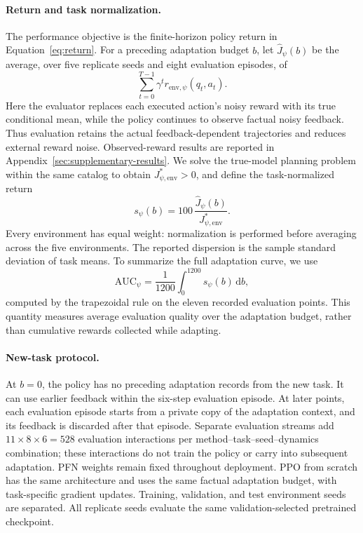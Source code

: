 \documentclass[a4paper,11pt]{article}
\numberwithin{equation}{section}
\begin{document}
\paragraph{Return and task normalization.}
The performance objective is the finite-horizon policy return in Equation~\eqref{eq:return}. For a preceding adaptation budget $b$, let $\widehat J_{\psi}(b)$ be the average, over five replicate seeds and eight evaluation episodes, of
\begin{equation}
\sum_{t=0}^{T-1}\gamma^t r_{\mathrm{env},\psi}(q_t,a_t).
\label{eq:empirical-mean-return}
\end{equation}
Here the evaluator replaces each executed action's noisy reward with its true conditional mean, while the policy continues to observe factual noisy feedback. Thus evaluation retains the actual feedback-dependent trajectories and reduces external reward noise. Observed-reward results are reported in Appendix~\ref{sec:supplementary-results}. We solve the true-model planning problem within the same catalog to obtain $J^*_{\psi,\mathrm{env}}>0$, and define the task-normalized return
\begin{equation}
s_{\psi}(b)=100\,\frac{\widehat J_{\psi}(b)}{J^*_{\psi,\mathrm{env}}}.
\label{eq:normalized-return}
\end{equation}
Every environment has equal weight: normalization is performed before averaging across the five environments. The reported dispersion is the sample standard deviation of task means. To summarize the full adaptation curve, we use
\begin{equation}
\mathrm{AUC}_{\psi}=\frac{1}{1200}\int_{0}^{1200}s_{\psi}(b)\,\mathrm db,
\label{eq:normalized-auc}
\end{equation}
computed by the trapezoidal rule on the eleven recorded evaluation points. This quantity measures average evaluation quality over the adaptation budget, rather than cumulative rewards collected while adapting.

\paragraph{New-task protocol.}
At $b=0$, the policy has no preceding adaptation records from the new task. It can use earlier feedback within the six-step evaluation episode. At later points, each evaluation episode starts from a private copy of the adaptation context, and its feedback is discarded after that episode. Separate evaluation streams add $11\times8\times6=528$ evaluation interactions per method--task--seed--dynamics combination; these interactions do not train the policy or carry into subsequent adaptation. PFN weights remain fixed throughout deployment. PPO from scratch has the same architecture and uses the same factual adaptation budget, with task-specific gradient updates. Training, validation, and test environment seeds are separated. All replicate seeds evaluate the same validation-selected pretrained checkpoint.
\end{document}
